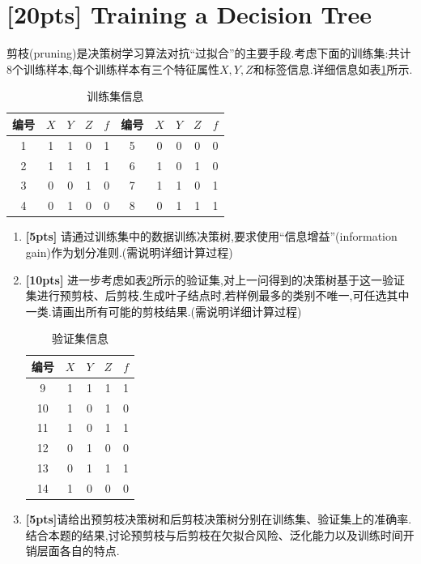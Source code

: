 \documentclass[a4paper,UTF8]{article}
\numberwithin{equation}{section}
\theoremstyle{definition}
\begin{document}
\newpage

\section{[20pts] Training a Decision Tree}
剪枝(pruning)是决策树学习算法对抗“过拟合”的主要手段.考虑下面的训练集:共计8个训练样本,每个训练样本有三个特征属性$X,Y,Z$和标签信息.详细信息如表\ref{problem2_training_set}所示.
\begin{table}[ht]
    \centering
	\setlength{\abovecaptionskip}{0pt}
	\setlength{\belowcaptionskip}{5pt}
    \caption{训练集信息}
	\label{problem2_training_set}
    \begin{tabular}{cccc|c||cccc|c}
        \hline 
        编号 & $X$ & $Y$ & $Z$ & $f$ & 编号 & $X$ & $Y$ & $Z$ & $f$ \\
    \hline1 &   1 &  1 &   0 &   1 &   5 &    0 &   0 &   0 &   0\\
          2 &   1 &  1 &   1 &   1 &   6 &    1 &   0 &   1 &   0 \\
          3 &   0 &  0 &   1 &   0 &   7 &    1 &   1 &   0 &   1\\
          4 &   0 &  1 &   0 &   0 &   8 &    0 &   1 &   1 &   1\\
        \hline
    \end{tabular}
\end{table}
\begin{enumerate}
	\item[(1)] \textbf{[5pts]} 请通过训练集中的数据训练决策树,要求使用“信息增益”(information gain)作为划分准则.(需说明详细计算过程)
	\item[(2)] \textbf{[10pts]} 进一步考虑如表\ref{problem2_validation_set}所示的验证集,对上一问得到的决策树基于这一验证集进行预剪枝、后剪枝.生成叶子结点时,若样例最多的类别不唯一,可任选其中一类.请画出所有可能的剪枝结果.(需说明详细计算过程)
	\begin{table}[ht]
		\centering
		\setlength{\abovecaptionskip}{0pt}
		\setlength{\belowcaptionskip}{5pt}
		\caption{验证集信息}
		\label{problem2_validation_set}
		\begin{tabular}{cccc|c}
		\hline
		编号 & $X$ & $Y$ & $Z$ & $f$ \\ \hline
		  9 &   1 &   1&   1&    1\\
		  10 &   1&    0&   1&    0\\
		  11 &   1&    0&   1&    1\\
		  12 &   0&    1&   0&    0\\
		  13 &   0&    1&   1&    1\\
		  14 &   1&    0&   0&    0\\ \hline
		\end{tabular}
	\end{table}
	\item[(3)] \textbf{[5pts]}请给出预剪枝决策树和后剪枝决策树分别在训练集、验证集上的准确率. 结合本题的结果,讨论预剪枝与后剪枝在欠拟合风险、泛化能力以及训练时间开销层面各自的特点. 
\end{enumerate}
\end{document}
